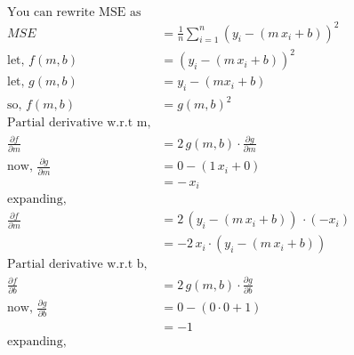 \documentclass[11pt, a4paper]{article}
\begin{document}
\begin{align*}
    \text{You can rewrite MSE as}                                                                               \\
    MSE                                        & = \frac{1}{n} \sum_{i = 1}^{n} (y_i - (m \, x_i + b))^2        \\
    \text{let, } f(m, b)                       & = (y_i - (m \, x_i + b))^2                                     \\
    \text{let, }  g(m, b)                      & = y_i - (m x_i + b)                                            \\
    \text{so, } f(m, b)                        & = g(m, b)^2                                                    \\
    \text{Partial derivative w.r.t m,}                                                                          \\
    \frac{\partial f}{\partial m}              & = 2 \, g(m, b) \cdot  \frac{\partial g}{\partial m}            \\
    \text{now, } \frac{\partial g}{\partial m} & = 0 - (1\, x_i + 0)                                            \\
                                               & = -\, x_i                                                      \\
    \text{expanding, }                                                                                          \\
    \frac{\partial f}{\partial m}              & = 2 \, (y_i - (m\, x_i + b)) \, \cdot (-x_i)                   \\
                                               & = -2\, x_i \cdot (y_i - (m\, x_i + b))                         \\
    \text{Partial derivative w.r.t b,}                                                                          \\
    \frac{\partial f}{\partial b}              & = 2 \, g(m, b) \cdot \frac{\partial g}{\partial b}                 \\
    \text{now, } \frac{\partial g}{\partial b} & = 0 - (0\cdot 0 + 1)                                           \\
                                               & = -1                                                           \\
    \text{expanding, }                                                                                          \\

\end{align*}
\end{document}
